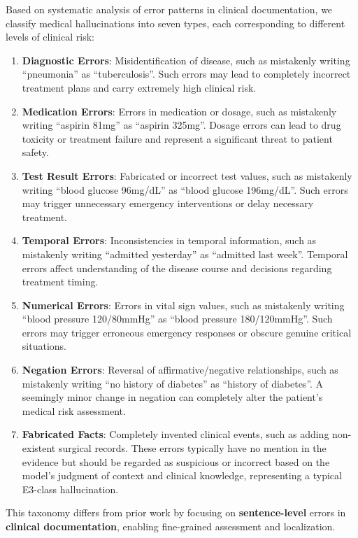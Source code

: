\documentclass[11pt]{article}
\begin{document}
Based on systematic analysis of error patterns in clinical documentation, we classify medical hallucinations into seven types, each corresponding to different levels of clinical risk:

\begin{enumerate}
\def\labelenumi{\arabic{enumi}.}
\item
  \textbf{Diagnostic Errors}: Misidentification of disease, such as mistakenly writing ``pneumonia'' as ``tuberculosis''. Such errors may lead to completely incorrect treatment plans and carry extremely high clinical risk.
\item
  \textbf{Medication Errors}: Errors in medication or dosage, such as mistakenly writing ``aspirin 81mg'' as ``aspirin 325mg''. Dosage errors can lead to drug toxicity or treatment failure and represent a significant threat to patient safety.
\item
  \textbf{Test Result Errors}: Fabricated or incorrect test values, such as mistakenly writing ``blood glucose 96mg/dL'' as ``blood glucose 196mg/dL''. Such errors may trigger unnecessary emergency interventions or delay necessary treatment.
\item
  \textbf{Temporal Errors}: Inconsistencies in temporal information, such as mistakenly writing ``admitted yesterday'' as ``admitted last week''. Temporal errors affect understanding of the disease course and decisions regarding treatment timing.
\item
  \textbf{Numerical Errors}: Errors in vital sign values, such as mistakenly writing ``blood pressure 120/80mmHg'' as ``blood pressure 180/120mmHg''. Such errors may trigger erroneous emergency responses or obscure genuine critical situations.
\item
  \textbf{Negation Errors}: Reversal of affirmative/negative relationships, such as mistakenly writing ``no history of diabetes'' as ``history of diabetes''. A seemingly minor change in negation can completely alter the patient's medical risk assessment.
\item
  \textbf{Fabricated Facts}: Completely invented clinical events, such as adding non-existent surgical records. These errors typically have no mention in the evidence but should be regarded as suspicious or incorrect based on the model's judgment of context and clinical knowledge, representing a typical E3-class hallucination.
\end{enumerate}

This taxonomy differs from prior work \citep{rotmensch2017healthKnowledgeGraph,ji2023hallucinationSurvey} by focusing on \textbf{sentence-level} errors in \textbf{clinical documentation}, enabling fine-grained assessment and localization.
\end{document}
